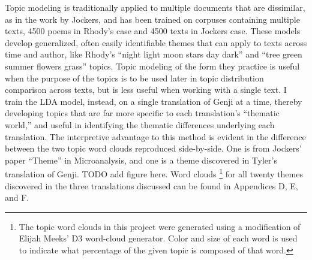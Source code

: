 \documentclass[12pt]{article}
\begin{document}
\begin{flushleft}
\begin{spacing}{2.0}
Topic modeling is traditionally applied to multiple documents that are dissimilar, as in the work by Jockers, and has been trained on corpuses containing multiple texts, 4500 poems in Rhody’s case and 4500 texts in Jockers case. These models develop generalized, often easily identifiable themes that can apply to texts across time and author, like Rhody’s ``night light moon stars day dark'' and ``tree green summer flowers grass'' topics. Topic modeling of the form they practice is useful when the purpose of the topics is to be used later in topic distribution comparison across texts, but is less useful when working with a single text. I train the LDA model, instead, on a single translation of Genji at a time, thereby developing topics that are far more specific to each translation’s ``thematic world,'' and useful in identifying the thematic differences underlying each translation. The interpretive advantage to this method is evident in the difference between the two topic word clouds reproduced side-by-side. One is from Jockers’ paper ``Theme'' in Microanalysis, and one is a theme discovered in Tyler’s translation of Genji. TODO add figure here. Word clouds \footnote{The topic word clouds in this project were generated using a modification of Elijah Meeks’ D3 word-cloud generator. Color and size of each word is used to indicate what percentage of the given topic is composed of that word.} for all twenty themes discovered in the three translations discussed can be found in Appendices D, E, and F.

\end{spacing}
\end{flushleft}
\end{document}
